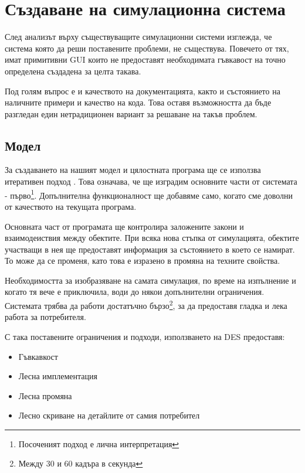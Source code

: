 \section{Създаване на симулационна система}
	
	След анализът върху съществуващите симулационни системи изглежда, че
	система която да реши поставените проблеми, не съществува.
	Повечето от тях, имат примитивни \ac{GUI} които не предоставят
	необходимата гъвкавост на точно определена създадена за целта такава.
	
	Под голям въпрос е и качеството на документацията, както и състоянието на
	наличните примери и качество на кода. Това оставя възможността да бъде разгледан
	един нетрадиционен вариант за решаване на такъв проблем.

	\subsection{Модел}
	
		За създаването на нашият модел и цялостната програма ще се използва итеративен подход \cite{ArtOfAgile}.
		Това означава, че ще изградим основните части от системата - 
		първо\footnote{Посоченият подход е лична интерпретация}. Допълнителна 
		функционалност ще добавяме само, когато сме доволни от качеството на текущата програма. 
				
		Основната част от програмата ще контролира заложените закони и взаимодеиствия	между обектите.
		При всяка нова стъпка от симулацията, обектите участващи в нея ще предоставят информация за
		състоянието в което се намират. То може да се променя, като това е изразено в промяна
		на техните свойства.
		
		Необходимостта за изобразяване на самата симулация, по време на изпълнение и когато тя вече е приключила,
		води до някои допълнителни ограничения. Системата трябва да работи достатъчно бързо\footnote{Между 30 и 60 кадъра в секунда},
		за да предоставя гладка и лека работа за потребителя.
		
		С така поставените ограничения и подходи, използването на \ac{DES} предоставя:
		
		\begin{itemize}
			\item Гъвкавкост
			\item Лесна имплементация
			\item Лесна промяна
			\item Лесно скриване на детайлите от самия потребител			
		\end{itemize}				
		
